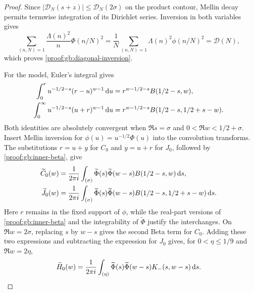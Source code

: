 \documentclass[12pt,a4paper]{amsart}
\numberwithin{equation}{section}
\def\d{\,{\rm d}}
\def\le{\leqslant}
\theoremstyle{plain}
\theoremstyle{definition}
\theoremstyle{remark}
\begin{document}
\begin{proof}
Since $|\mathscr D_N(s+z)|\le\mathscr D_N(2\sigma)$ on the product
contour, Mellin decay permits termwise integration of its Dirichlet
series. Inversion in both variables gives
\[
 \sum_{(n,N)=1}\frac{\Lambda(n)^2}{n}\Phi(n/N)^2
 =\frac1N\sum_{(n,N)=1}\Lambda(n)^2\phi(n/N)^2
 =\mathcal D(N),
\]
which proves \eqref{proof:gb:diagonal-inversion}.

For the model, Euler's integral gives
\begin{equation}\label{proof:gb:inner-beta}
 \begin{aligned}
 \int_0^r u^{-1/2-s}(r-u)^{w-1}\d u
 &=r^{w-1/2-s}B(1/2-s,w),\\
 \int_0^\infty u^{-1/2-s}(u+r)^{w-1}\d u
 &=r^{w-1/2-s}B(1/2-s,1/2+s-w).
 \end{aligned}
\end{equation}
Both identities are absolutely convergent when
$\Re s=\sigma$ and $0<\Re w<1/2+\sigma$.
Insert Mellin inversion for $\phi(u)=u^{-1/2}\Phi(u)$ into the
convolution transforms. The substitutions $r=u+y$ for $C_0$ and
$y=u+r$ for $J_0$, followed by \eqref{proof:gb:inner-beta}, give
\[
 \begin{aligned}
 \widetilde C_0(w)
 &=\frac1{2\pi i}\int_{(\sigma)}
   \widetilde\Phi(s)\widetilde\Phi(w-s)B(1/2-s,w)\d s,\\
 \widetilde J_0(w)
 &=\frac1{2\pi i}\int_{(\sigma)}
   \widetilde\Phi(s)\widetilde\Phi(w-s)
   B(1/2-s,1/2+s-w)\d s.
 \end{aligned}
\]
Here $r$ remains in the fixed support of $\phi$, while the real-part
versions of \eqref{proof:gb:inner-beta} and the integrability of
$\widetilde\Phi$ justify the interchanges. On $\Re w=2\sigma$,
replacing $s$ by $w-s$ gives the second Beta term for $C_0$.
Adding these two expressions and subtracting the expression for $J_0$
gives, for $0<\eta\le1/9$ and $\Re w=2\eta$,
\begin{equation}\label{gb:beta-mellin}
 \widetilde H_0(w)=\frac1{2\pi i}\int_{(\eta)}
 \widetilde{\Phi}(s)\widetilde{\Phi}(w-s)K_-(s,w-s)\d s.
\end{equation}


\end{proof}
\end{document}
